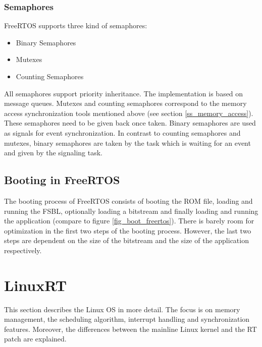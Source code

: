 \subsubsection{Semaphores}
FreeRTOS supports three kind of semaphores:
\begin{itemize}
	\item Binary Semaphores
	\item Mutexes
	\item Counting Semaphores
\end{itemize}
All semaphores support priority inheritance.
The implementation is based on message queues.
Mutexes and counting semaphores correspond to the memory access synchronization tools mentioned above (see section \ref{ss_memory_access}). 
These semaphores need to be given back once taken.
Binary semaphores are used as signals for event synchronization.
In contrast to counting semaphores and mutexes, binary semaphores are taken by the task which is waiting for an event and given by the signaling task. 

\subsection{Booting in FreeRTOS}\label{ss_booting_in_freertos}
The booting process of FreeRTOS consists of booting the \ac{ROM} file, loading and running the \ac{FSBL}, optionally loading a bitstream and finally loading and running the application (compare to figure \ref{fig_boot_freertos}).
There is barely room for optimization in the first two steps of the booting process. 
However, the last two steps are dependent on the size of the bitstream and the size of the application respectively.

\section{LinuxRT}
This section describes the Linux \ac{OS} in more detail.
The focus is on memory management, the scheduling algorithm, interrupt handling and synchronization features.
Moreover, the differences between the mainline Linux kernel and the RT patch are explained.

